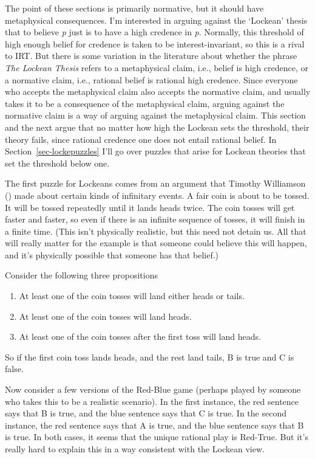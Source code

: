 \documentclass[
  10pt,
  letterpaper,
  twoside]{scrbook}
\providecommand{\tightlist}{%
  \setlength{\itemsep}{0pt}\setlength{\parskip}{0pt}}\usepackage{longtable,booktabs,array}
\begin{document}
The point of these sections is primarily normative, but it should have
metaphysical consequences. I'm interested in arguing against the
`Lockean' thesis that to believe \emph{p} just is to have a high
credence in \emph{p}. Normally, this threshold of high enough belief for
credence is taken to be interest-invariant, so this is a rival to IRT.
But there is some variation in the literature about whether the phrase
\emph{The Lockean Thesis} refers to a metaphysical claim, i.e., belief
is high credence, or a normative claim, i.e., rational belief is
rational high credence. Since everyone who accepts the metaphysical
claim also accepts the normative claim, and usually takes it to be a
consequence of the metaphysical claim, arguing against the normative
claim is a way of arguing against the metaphysical claim. This section
and the next argue that no matter how high the Lockean sets the
threshold, their theory fails, since rational credence one does not
entail rational belief. In Section~\ref{sec-lockepuzzles} I'll go over
puzzles that arise for Lockean theories that set the threshold below
one.

The first puzzle for Lockeans comes from an argument that Timothy
Williamson () made about certain
kinds of infinitary events. A fair coin is about to be tossed. It will
be tossed repeatedly until it lands heads twice. The coin tosses will
get faster and faster, so even if there is an infinite sequence of
tosses, it will finish in a finite time. (This isn't physically
realistic, but this need not detain us. All that will really matter for
the example is that someone could believe this will happen, and it's
physically possible that someone has that belief.)

Consider the following three propositions

\begin{enumerate}
\def\labelenumi{\Alph{enumi}.}
\tightlist
\item
  At least one of the coin tosses will land either heads or tails.
\item
  At least one of the coin tosses will land heads.
\item
  At least one of the coin tosses after the first toss will land heads.
\end{enumerate}

So if the first coin toss lands heads, and the rest land tails, B is
true and C is false.

Now consider a few versions of the Red-Blue game (perhaps played by
someone who takes this to be a realistic scenario). In the first
instance, the red sentence says that B is true, and the blue sentence
says that C is true. In the second instance, the red sentence says that
A is true, and the blue sentence says that B is true. In both cases, it
seems that the unique rational play is Red-True. But it's really hard to
explain this in a way consistent with the Lockean view.
\end{document}
